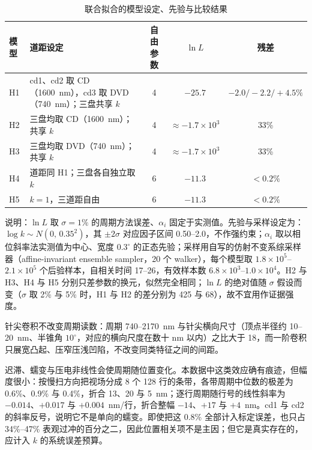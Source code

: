 \documentclass[12pt,a4paper,fontset=windows]{ctexart}
\begin{document}
\begin{table}[H]
\centering
\caption{联合拟合的模型设定、先验与比较结果}
\label{tab:models}
\footnotesize
{}
\begin{tabularx}{\textwidth}{@{}l X c c c@{}}
\toprule
模型 & 道距设定 & 自由参数 & $\ln L$ & 残差 \\
\midrule
H1 & cd1、cd2 取 CD（1600~nm），cd3 取 DVD（740~nm）；三盘共享 $k$ & 4 & $-25.7$ & $-2.0/-2.2/+4.5\%$ \\
H2 & 三盘均取 CD（1600~nm）；共享 $k$ & 4 & $\approx-1.7\times10^{3}$ & 33\% \\
H3 & 三盘均取 DVD（740~nm）；共享 $k$ & 4 & $\approx-1.7\times10^{3}$ & 33\% \\
H4 & 道距同 H1；三盘各自独立取 $k$ & 6 & $-11.3$ & $<0.2\%$ \\
H5 & $k=1$，三道距自由 & 6 & $-11.3$ & $<0.2\%$ \\
\bottomrule
\end{tabularx}

\vspace{2pt}
\footnotesize 说明：$\ln L$ 取 $\sigma=1\%$ 的周期方法误差、$\alpha_i$ 固定于实测值。先验与采样设定为：$\log k\sim N(0,\,0.35^{2})$，其 $\pm2\sigma$ 对应因子区间 0.50--2.0，不作强约束；$\alpha_i$ 取以相位斜率法实测值为中心、宽度 $0.3^\circ$ 的正态先验；采样用自写的仿射不变系综采样器（affine-invariant ensemble sampler，20 个 walker），每个模型取 $1.8\times10^{5}$--$2.1\times10^{5}$ 个后验样本，自相关时间 17--26，有效样本数 $6.8\times10^{3}$--$1.0\times10^{4}$。H2 与 H3、H4 与 H5 分别只差参数的换元，似然完全相同；$\ln L$ 的绝对值随 $\sigma$ 假设而变（$\sigma$ 取 2\% 与 5\% 时，H1 与 H2 的差分别为 425 与 68），故不宜用作证据强度。
\end{table}



针尖卷积不改变周期读数：周期 740--2170~nm 与针尖横向尺寸（顶点半径约 10--20~nm、半锥角 $10^\circ$，对应的横向尺度在数十 nm 以内）之比大于 18，而一阶卷积只展宽凸起、压窄压浅凹陷，不改变同类特征之间的间距。

迟滞、蠕变与压电非线性会使周期随位置变化。本数据中这类效应确有痕迹，但幅度很小：按慢扫方向把视场分成 8 个 128 行的条带，各带周期中位数的极差为 0.6\%、0.9\% 与 0.4\%，折合 13、20 与 5~nm；逐行周期随行号的线性斜率为 $-0.014$、$+0.017$ 与 $+0.004$~nm/行，折合整幅 $-14$、$+17$ 与 $+4$~nm。cd1 与 cd2 的斜率反号，说明它不是单向的蠕变。即使把这 0.8\% 全部计入标定误差，也只占 34\%--47\% 表观过冲的百分之二，因此位置相关项不是主因；但它是真实存在的，应计入 $k$ 的系统误差预算。
\end{document}
